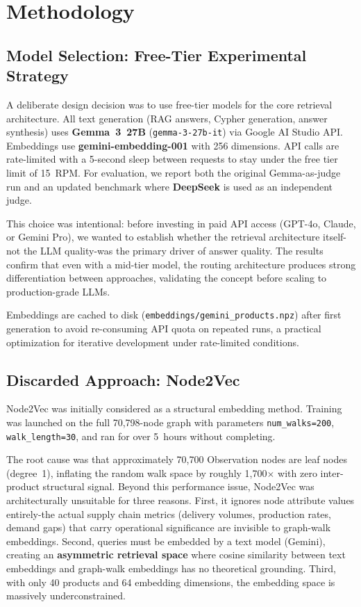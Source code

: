 \documentclass[11pt,a4paper]{article}
\begin{document}
\section{Methodology}

\subsection{Model Selection: Free-Tier Experimental Strategy}

A deliberate design decision was to use free-tier models for the core retrieval architecture. All text generation (RAG answers, Cypher generation, answer synthesis) uses \textbf{Gemma~3~27B} (\texttt{gemma-3-27b-it}) via Google AI Studio API. Embeddings use \textbf{gemini-embedding-001} with 256 dimensions. API calls are rate-limited with a 5-second sleep between requests to stay under the free tier limit of 15~RPM. For evaluation, we report both the original Gemma-as-judge run and an updated benchmark where \textbf{DeepSeek} is used as an independent judge.

This choice was intentional: before investing in paid API access (GPT-4o, Claude, or Gemini Pro), we wanted to establish whether the retrieval architecture itself-not the LLM quality-was the primary driver of answer quality. The results confirm that even with a mid-tier model, the routing architecture produces strong differentiation between approaches, validating the concept before scaling to production-grade LLMs.

Embeddings are cached to disk (\texttt{embeddings/gemini\_products.npz}) after first generation to avoid re-consuming API quota on repeated runs, a practical optimization for iterative development under rate-limited conditions.

\subsection{Discarded Approach: Node2Vec}

Node2Vec was initially considered as a structural embedding method. Training was launched on the full 70{,}798-node graph with parameters \texttt{num\_walks=200}, \texttt{walk\_length=30}, and ran for over 5~hours without completing.

The root cause was that approximately 70{,}700 Observation nodes are leaf nodes (degree~1), inflating the random walk space by roughly 1{,}700$\times$ with zero inter-product structural signal. Beyond this performance issue, Node2Vec was architecturally unsuitable for three reasons. First, it ignores node attribute values entirely-the actual supply chain metrics (delivery volumes, production rates, demand gaps) that carry operational significance are invisible to graph-walk embeddings. Second, queries must be embedded by a text model (Gemini), creating an \textbf{asymmetric retrieval space} where cosine similarity between text embeddings and graph-walk embeddings has no theoretical grounding. Third, with only 40 products and 64 embedding dimensions, the embedding space is massively underconstrained.
\end{document}
